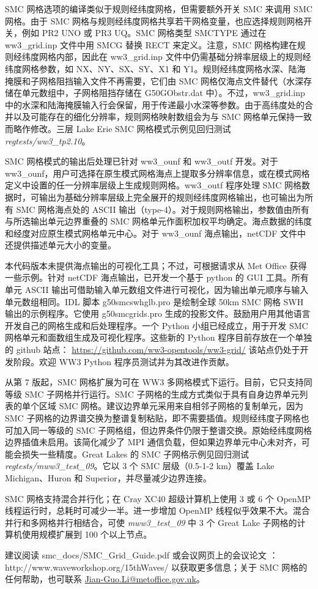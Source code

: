 SMC 网格选项的编译类似于规则经纬度网格，但需要额外开关 {\code SMC} 来调用 SMC 网格。由于 SMC 网格与规则经纬度网格共享若干网格变量，也应选择规则网格开关，例如 {\code PR2 UNO} 或 {\code PR3 UQ}。SMC 网格类型 {\code SMCTYPE} 通过在 ww3\_grid.inp 文件中用 {\code SMCG} 替换 {\code RECT} 来定义。注意，SMC 网格构建在规则经纬度网格内部，因此在 ww3\_grid.inp 文件中仍需基础分辨率层级上的规则经纬度网格参数，如 NX、NY、SX、SY、X1 和 Y1。规则经纬度网格水深、陆海掩膜和子网格阻挡输入文件不再需要，它们由 SMC 网格仅海点文件替代（水深存储在单元数组中，子网格阻挡存储在 G50GObstr.dat 中）。不过，ww3\_grid.inp 中的水深和陆海掩膜输入行会保留，用于传递最小水深等参数。由于高纬度处的合并以及可能存在的细化分辨率，规则网格映射数组会为与 SMC 网格单元保持一致而略作修改。三层 Lake Erie SMC 网格模式示例见回归测试 \emph{regtests/ww3\_tp2.10}。

SMC 网格模式的输出后处理已针对 ww3\_ounf 和 ww3\_outf 开发。对于 ww3\_ounf，用户可选择在原生模式网格海点上提取多分辨率信息，或在模式网格定义中设置的任一分辨率层级上生成规则网格。ww3\_outf 程序处理 SMC 网格数据时，可输出为基础分辨率层级上完全展开的规则经纬度网格输出，也可输出为所有 SMC 网格海点处的 ASCII 输出（type-4）。对于规则网格输出，参数值由所有与所选输出单元边界重叠的 SMC 网格单元作面积加权平均确定。海点数据的纬度和经度对应原生模式网格单元中心。对于 ww3\_ounf 海点输出，netCDF 文件中还提供描述单元大小的变量。

本代码版本未提供海点输出的可视化工具；不过，可根据请求从 Met Office 获得一些示例。针对 netCDF 海点输出，已开发一个基于 python 的 GUI 工具。所有单元 ASCII 输出可借助输入单元数组文件进行可视化，因为输出单元顺序与输入单元数组相同。IDL 脚本 g50smcswhglb.pro 是绘制全球 50km SMC 网格 SWH 输出的示例程序。它使用 g50smcgrids.pro 生成的投影文件。鼓励用户用其他语言开发自己的网格生成和后处理程序。一个 Python 小组已经成立，用于开发 SMC 网格单元和面数组生成及可视化程序。这些新的 Python 程序目前存放在一个单独的 github 站点：  
\url{https://github.com/ww3-opentools/ww3-grid/}
该站点仍处于开发阶段。欢迎 WW3 Python 程序员测试并为其改进作贡献。

从第 7 版起，SMC 网格扩展为可在 WW3 多网格模式下运行。目前，它只支持同等级 SMC 子网格并行运行。SMC 子网格的生成方式类似于具有自身边界单元列表的单个区域 SMC 网格。建议边界单元采用来自相邻子网格的复制单元，因为 SMC 子网格的边界谱交换为整谱复制粘贴，即不需要插值。规则经纬度子网格也可加入同一等级的 SMC 子网格组，但边界条件仍限于整谱交换。原始经纬度网格边界插值未启用。该简化减少了 MPI 通信负载，但如果边界单元中心未对齐，可能会损失一些精度。Great Lakes 的 SMC 子网格示例见回归测试 \emph{regtests/mww3\_test\_09}。它以 3 个 SMC 层级（0.5-1-2 km）覆盖 Lake Michigan、Huron 和 Superior，并尽量减少边界连接。
  
SMC 网格支持混合并行化；在 Cray XC40 超级计算机上使用 3 或 6 个 OpenMP 线程运行时，总耗时可减少一半。进一步增加 OpenMP 线程似乎效果不大。混合并行和多网格并行相结合，可使 \emph{mww3\_test\_09} 中 3 个 Great Lake 子网格的计算机使用规模扩展到 100 个以上节点。

建议阅读 smc\_docs/SMC\_Grid\_Guide.pdf 或会议网页上的会议论文 \citep{tol:LiS17}：
http://www.waveworkshop.org/15thWaves/
以获取更多信息；关于 SMC 网格的任何帮助，也可联系 \url{Jian-Guo.Li@metoffice.gov.uk}。

